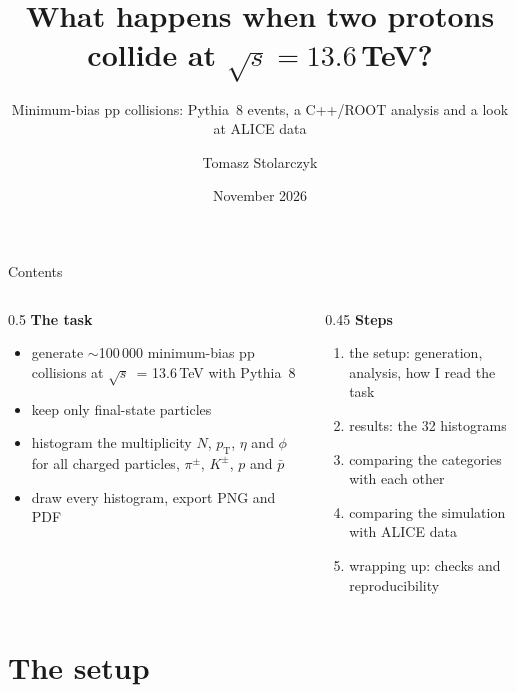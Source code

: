 \documentclass[aspectratio=169,11pt]{beamer}
\title{What happens when two protons collide at \texorpdfstring{$\sqrt{s} = 13.6$\,TeV}{√s = 13.6 TeV}?}
\subtitle{Minimum-bias pp collisions: Pythia~8 events, a C++/ROOT analysis and a look at ALICE data}
\author{Tomasz Stolarczyk}
\date{November 2026}
\institute{\texttt{github.com/tomekstolarczyk/pp-minbias-13p6tev}}
\newcommand{\pt}{\ensuremath{p_\mathrm{T}}}
\newcommand{\sqs}{\ensuremath{\sqrt{s}}}
\newcommand{\pbar}{\ensuremath{\bar{p}}}
\begin{document}
\maketitle

\begin{frame}{Contents}
  \begin{columns}[T]
    \begin{column}{0.5\textwidth}
      \textbf{The task}
      \begin{itemize}
        \item generate $\sim$100\,000 minimum-bias pp collisions at \sqs\ = 13.6\,TeV with Pythia~8
        \item keep only final-state particles
        \item histogram the multiplicity $N$, \pt, $\eta$ and $\phi$ for all charged particles,
              $\pi^\pm$, $K^\pm$, $p$ and \pbar
        \item draw every histogram, export PNG and PDF
      \end{itemize}
    \end{column}
    \begin{column}{0.45\textwidth}
      \textbf{Steps}
      \begin{enumerate}
        \item the setup: generation, analysis, how I read the task
        \item results: the 32 histograms
        \item comparing the categories with each other
        \item comparing the simulation with ALICE data
        \item wrapping up: checks and reproducibility
      \end{enumerate}
    \end{column}
  \end{columns}
\end{frame}

\section{The setup}
\end{document}
